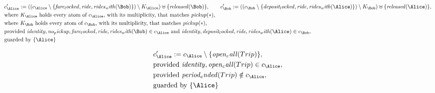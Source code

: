 \begin{align*}
&
c'_
{
\Alice
}
 := 
(
(c_
{
\Alice
}
 \setminus 
\{
\mathit{
fare_locked
}
,
\mathit{
ride
}
,
\mathit{
rides_with
}
(
\Bob
)
\}
) \setminus K_
{
\Alice
}
) \uplus 
\{
\mathit{
released
}
(
\Bob
)
\}
, \qquad 
c'_
{
\Bob
}
 := 
(
(c_
{
\Bob
}
 \setminus 
\{
\mathit{
deposit_locked
}
,
\mathit{
ride
}
,
\mathit{
rides_with
}
(
\Alice
)
\}
) \setminus K_
{
\Bob
}
) \uplus 
\{
\mathit{
released
}
(
\Alice
)
\}
,\\
&
\text{where } K_
{
\Alice
}
 \text{ holds every atom of } c_
{
\Alice
}
 \text{, with its multiplicity, that matches } 
\mathit{
pickup
}
(
\ast
)
,\\
&
\text{where } K_
{
\Bob
}
 \text{ holds every atom of } c_
{
\Bob
}
 \text{, with its multiplicity, that matches } 
\mathit{
pickup
}
(
\ast
)
,\\
&
\text{provided } 
\mathit{
identity
}
,
\mathit{
no_pickup
}
,
\mathit{
fare_locked
}
,
\mathit{
ride
}
,
\mathit{
rides_with
}
(
\Bob
)
 \in c_
{
\Alice
}
 \text{ and } 
\mathit{
identity
}
,
\mathit{
deposit_locked
}
,
\mathit{
ride
}
,
\mathit{
rides_with
}
(
\Alice
)
 \in c_
{
\Bob
}
,\\
&
\text{guarded by } \{
\Alice
\}
\end{align*}

\begin{align*}
&
c'_
{
\Alice
}
 := 
c_
{
\Alice
}
 \setminus 
\{
\mathit{
open_call
}
(
Trip
)
\}
,\\
&
\text{provided } 
\mathit{
identity
}
,
\mathit{
open_call
}
(
Trip
)
 \in c_
{
\Alice
}
,\\
&
\text{provided } 
\mathit{
period_ended
}
(
Trip
)
 \notin c_
{
\Alice
}
,\\
&
\text{guarded by } \{
\Alice
\}
\end{align*}
